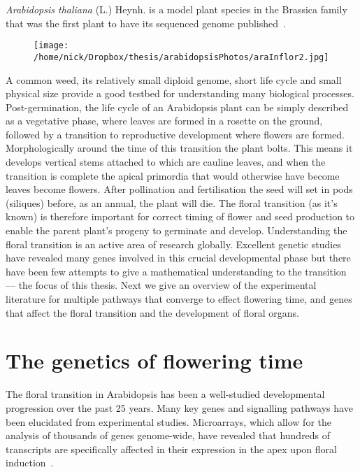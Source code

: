 \emph{Arabidopsis thaliana} (L.) Heynh\@. is a model plant species in the Brassica family that was the first plant to have its sequenced genome published~\cite{arabidopsis2000}.
\begin{figure}[htb!]
  \texttt{[image: /home/nick/Dropbox/thesis/arabidopsisPhotos/araInflor2.jpg]}  
  \label{fig:araInflor}
\end{figure}
A common weed, its relatively small diploid genome, short life cycle and small physical size provide a good testbed for understanding many biological processes.
Post-germination, the life cycle of an Arabidopsis plant can be simply described as a vegetative phase, where leaves are formed in a rosette on the ground, followed by a transition to reproductive development where flowers are formed.
Morphologically around the time of this transition the plant bolts.
This means it develops vertical stems attached to which are cauline leaves, and when the transition is complete the apical primordia that would otherwise have become leaves become flowers.
After pollination and fertilisation the seed will set in pods (siliques) before, as an annual, the plant will die.
The floral transition (as it's known) is therefore important for correct timing of flower and seed production to enable the parent plant's progeny to germinate and develop.
Understanding the floral transition is an active area of research globally.
Excellent genetic studies have revealed many genes involved in this crucial developmental phase but there have been few attempts to give a mathematical understanding to the transition --- the focus of this thesis.
Next we give an overview of the experimental literature for multiple pathways that converge to effect flowering time, and genes that affect the floral transition and the development of floral organs.

\section{The genetics of flowering time}\label{sec:ftGenetics}
The floral transition in Arabidopsis has been a well-studied developmental progression over the past 25 years.
Many key genes and signalling pathways have been elucidated from experimental studies.
Microarrays, which allow for the analysis of thousands of genes genome-wide, have revealed that hundreds of transcripts are specifically affected in their expression in the apex upon floral induction~\cite{wellmer2006,schmid2003}.

